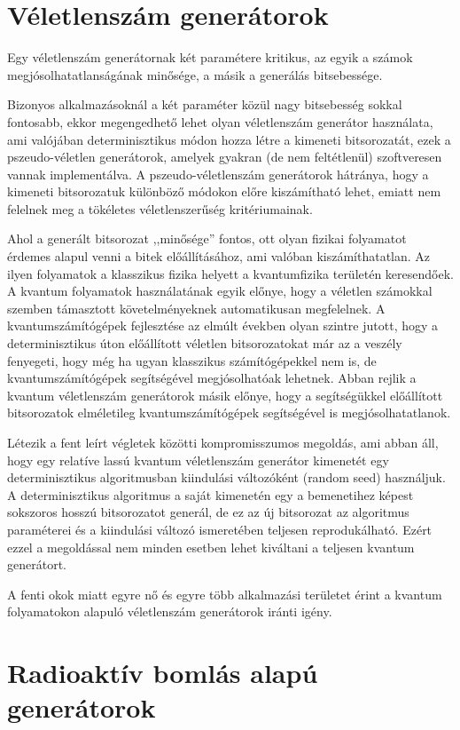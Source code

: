 \documentclass[12pt,a4paper,oneside]{article}
\begin{document}
\section*{Véletlenszám generátorok}
Egy véletlenszám generátornak két paramétere kritikus, az egyik a számok megjósolhatatlanságának minősége, a másik a generálás bitsebessége.
\par
Bizonyos alkalmazásoknál a két paraméter közül nagy bitsebesség sokkal fontosabb, ekkor megengedhető lehet olyan véletlenszám generátor használata, ami valójában determinisztikus módon hozza létre a kimeneti bitsorozatát, ezek a pszeudo-véletlen generátorok, amelyek gyakran (de nem feltétlenül) szoftveresen vannak implementálva. A pszeudo-véletlenszám generátorok hátránya, hogy a kimeneti bitsorozatuk különböző módokon előre kiszámítható lehet, emiatt nem felelnek meg a tökéletes véletlenszerűség kritériumainak.
\par
Ahol a generált bitsorozat ,,minősége'' fontos, ott olyan fizikai folyamatot érdemes alapul venni a bitek előállításához, ami valóban kiszámíthatatlan. Az ilyen folyamatok a klasszikus fizika helyett a kvantumfizika területén keresendőek. A kvantum folyamatok használatának egyik előnye, hogy a véletlen számokkal szemben támasztott követelményeknek automatikusan megfelelnek. A kvantumszámítógépek fejlesztése az elmúlt években olyan szintre jutott, hogy a determinisztikus úton előállított véletlen bitsorozatokat már az a veszély fenyegeti, hogy még ha ugyan klasszikus számítógépekkel nem is, de kvantumszámítógépek segítségével megjósolhatóak lehetnek. Abban rejlik a kvantum véletlenszám generátorok másik előnye, hogy a segítségükkel előállított bitsorozatok elméletileg kvantumszámítógépek segítségével is megjósolhatatlanok.
\par
Létezik a fent leírt végletek közötti kompromisszumos megoldás, ami abban áll, hogy egy relatíve lassú kvantum véletlenszám generátor kimenetét egy determinisztikus algoritmusban kiindulási változóként (random seed) használjuk. A determinisztikus algoritmus a saját kimenetén egy a bemenetihez képest sokszoros hosszú bitsorozatot generál, de ez az új bitsorozat az algoritmus paraméterei és a kiindulási változó ismeretében teljesen reprodukálható. Ezért ezzel a megoldással nem minden esetben lehet kiváltani a teljesen kvantum generátort.
\par
A fenti okok miatt egyre nő és egyre több alkalmazási területet érint a kvantum folyamatokon alapuló véletlenszám generátorok iránti igény.
\section*{Radioaktív bomlás alapú generátorok}
\end{document}
